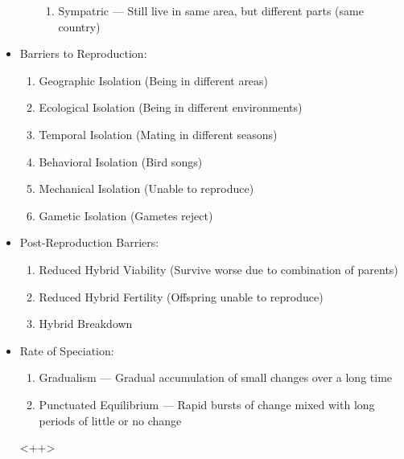 \documentclass[12pt]{article}
\begin{document}
\begin{itemize}
\begin{enumerate}
\begin{enumerate}
          \item Sympatric — Still live in same area, but different parts (same country)

        \end{enumerate}

    \end{enumerate}

  \item Barriers to Reproduction:

    \begin{enumerate}

      \item Geographic Isolation (Being in different areas)

      \item Ecological Isolation (Being in different environments)

      \item Temporal Isolation (Mating in different seasons)

      \item Behavioral Isolation (Bird songs)

      \item Mechanical Isolation (Unable to reproduce)

      \item Gametic Isolation (Gametes reject)

    \end{enumerate}

  \item Post-Reproduction Barriers:

    \begin{enumerate}

      \item Reduced Hybrid Viability (Survive worse due to combination of parents)

      \item Reduced Hybrid Fertility (Offspring unable to reproduce)

      \item Hybrid Breakdown

    \end{enumerate}

  \item Rate of Speciation:

    \begin{enumerate}

      \item Gradualism — Gradual accumulation of small changes over a long time

      \item Punctuated Equilibrium — Rapid bursts of change mixed with long periods of little or no change

    \end{enumerate}<++>

\end{itemize}
\end{document}

